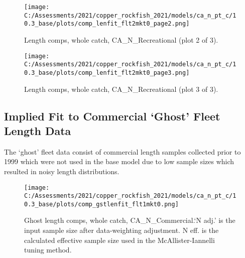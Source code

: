 \documentclass[11pt,
  english,
  a4paper,
]{article}
\begin{document}
\tagmcend\tagstructend


\begin{figure}
\centering
\texttt{[image: C:/Assessments/2021/copper\_rockfish\_2021/models/ca\_n\_pt\_c/10.3\_base/plots/comp\_lenfit\_flt2mkt0\_page2.png]}
\caption{Length comps, whole catch, CA\_N\_Recreational (plot 2 of 3).\label{fig:comp_lenfit_flt2mkt0_page2}}
\end{figure}

\tagmcend\tagstructend


\begin{figure}
\centering
\texttt{[image: C:/Assessments/2021/copper\_rockfish\_2021/models/ca\_n\_pt\_c/10.3\_base/plots/comp\_lenfit\_flt2mkt0\_page3.png]}
\caption{Length comps, whole catch, CA\_N\_Recreational (plot 3 of 3).\label{fig:comp_lenfit_flt2mkt0_page3}}
\end{figure}

\tagmcend\tagstructend

\newpage


\hypertarget{implied-fit-to-commercial-ghost-fleet-length-data}{%
\subsection{Implied Fit to Commercial `Ghost' Fleet Length Data}\label{implied-fit-to-commercial-ghost-fleet-length-data}}

\leavevmode\tagmcend\tagstructend


The `ghost' fleet data consist of commercial length samples collected prior to 1999 which were not used in the base model due to low sample sizes which resulted in noisy length distributions.

\leavevmode\tagmcend\tagstructend\par


\begin{figure}
\centering
\texttt{[image: C:/Assessments/2021/copper\_rockfish\_2021/models/ca\_n\_pt\_c/10.3\_base/plots/comp\_gstlenfit\_flt1mkt0.png]}
\caption{Ghost length comps, whole catch, CA\_N\_Commercial.`N adj.' is the input sample size after data-weighting adjustment. N eff. is the calculated effective sample size used in the McAllister-Iannelli tuning method.\label{fig:comp_gstlenfit_flt1mkt0}}
\end{figure}

\tagmcend\tagstructend
\end{document}
